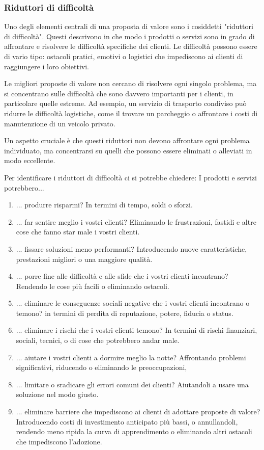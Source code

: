 \subsubsection{Riduttori di difficoltà}
Uno degli elementi centrali di una proposta di valore sono i cosiddetti "riduttori di difficoltà". Questi descrivono in che modo i prodotti o servizi sono in grado di affrontare e risolvere le difficoltà specifiche dei clienti. Le difficoltà possono essere di vario tipo: ostacoli pratici, emotivi o logistici che impediscono ai clienti di raggiungere i loro obiettivi.

Le migliori proposte di valore non cercano di risolvere ogni singolo problema, ma si concentrano sulle difficoltà che sono davvero importanti per i clienti, in particolare quelle estreme. Ad esempio, un servizio di trasporto condiviso può ridurre le difficoltà logistiche, come il trovare un parcheggio o affrontare i costi di manutenzione di un veicolo privato.

Un aspetto cruciale è che questi riduttori non devono affrontare ogni problema individuato, ma concentrarsi su quelli che possono essere eliminati o alleviati in modo eccellente.

Per identificare i riduttori di difficoltà ci si potrebbe chiedere: I prodotti e servizi potrebbero...
\begin{enumerate}
    \item ... produrre risparmi? In termini di tempo, soldi o sforzi.
    \item ... far sentire meglio i vostri clienti? Eliminando le frustrazioni, fastidi e altre cose che fanno star male i vostri clienti.
    \item ... fissare soluzioni meno performanti? Introducendo nuove caratteristiche, prestazioni migliori o una maggiore qualità.
    \item ... porre fine alle difficoltà e alle sfide che i vostri clienti incontrano? Rendendo le cose più facili o eliminando ostacoli.
    \item ... eliminare le conseguenze sociali negative che i vostri clienti incontrano o temono? in termini di perdita di reputazione, potere, fiducia o status.
    \item ... eliminare i rischi che i vostri clienti temono? In termini di rischi finanziari, sociali, tecnici, o di cose che potrebbero andar male.
    \item ... aiutare i vostri clienti a dormire meglio la notte? Affrontando problemi significativi, riducendo o eliminando le preoccupazioni,
    \item ... limitare o sradicare gli errori comuni dei clienti? Aiutandoli a usare una soluzione nel modo giusto.
    \item ... eliminare barriere che impediscono ai clienti di adottare proposte di valore? Introducendo costi di investimento anticipato più bassi, o annullandoli, rendendo meno ripida la curva di apprendimento o eliminando altri ostacoli che impediscono l'adozione.
\end{enumerate}

